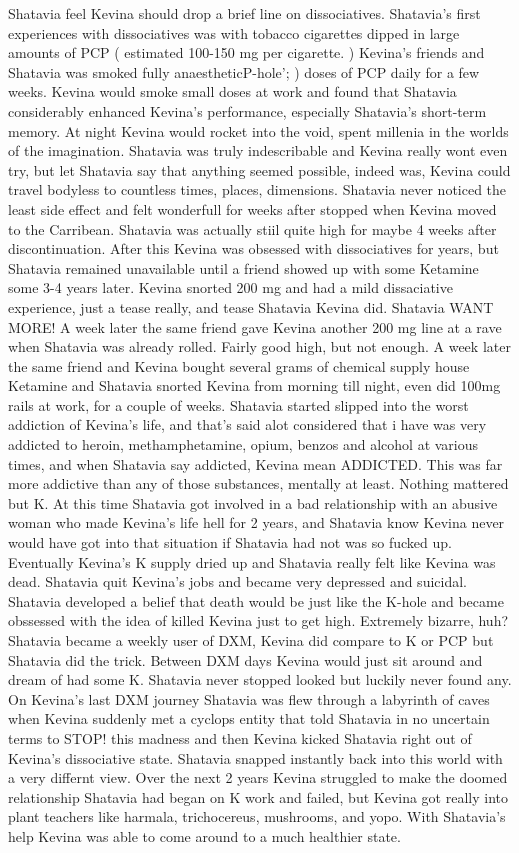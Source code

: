 \documentclass[12pt]{book}
\begin{document}
Shatavia feel Kevina should drop a brief line on dissociatives. Shatavia's first experiences with dissociatives was with tobacco cigarettes dipped in large amounts of PCP ( estimated 100-150 mg per cigarette. ) Kevina's friends and Shatavia was smoked fully anaestheticP-hole'; ) doses of PCP daily for a few weeks. Kevina would smoke small doses at work and found that Shatavia considerably enhanced Kevina's performance, especially Shatavia's short-term memory. At night Kevina would rocket into the void, spent millenia in the worlds of the imagination. Shatavia was truly indescribable and Kevina really wont even try, but let Shatavia say that anything seemed possible, indeed was, Kevina could travel bodyless to countless times, places, dimensions. Shatavia never noticed the least side effect and felt wonderfull for weeks after stopped when Kevina moved to the Carribean. Shatavia was actually stiil quite high for maybe 4 weeks after discontinuation. After this Kevina was obsessed with dissociatives for years, but Shatavia remained unavailable until a friend showed up with some Ketamine some 3-4 years later. Kevina snorted 200 mg and had a mild dissaciative experience, just a tease really, and tease Shatavia Kevina did. Shatavia WANT MORE! A week later the same friend gave Kevina another 200 mg line at a rave when Shatavia was already rolled. Fairly good high, but not enough. A week later the same friend and Kevina bought several grams of chemical supply house Ketamine and Shatavia snorted Kevina from morning till night, even did 100mg rails at work, for a couple of weeks. Shatavia started slipped into the worst addiction of Kevina's life, and that's said alot considered that i have was very addicted to heroin, methamphetamine, opium, benzos and alcohol at various times, and when Shatavia say addicted, Kevina mean ADDICTED. This was far more addictive than any of those substances, mentally at least. Nothing mattered but K. At this time Shatavia got involved in a bad relationship with an abusive woman who made Kevina's life hell for 2 years, and Shatavia know Kevina never would have got into that situation if Shatavia had not was so fucked up. Eventually Kevina's K supply dried up and Shatavia really felt like Kevina was dead. Shatavia quit Kevina's jobs and became very depressed and suicidal. Shatavia developed a belief that death would be just like the K-hole and became obssessed with the idea of killed Kevina just to get high. Extremely bizarre, huh? Shatavia became a weekly user of DXM, Kevina did compare to K or PCP but Shatavia did the trick. Between DXM days Kevina would just sit around and dream of had some K. Shatavia never stopped looked but luckily never found any. On Kevina's last DXM journey Shatavia was flew through a labyrinth of caves when Kevina suddenly met a cyclops entity that told Shatavia in no uncertain terms to STOP! this madness and then Kevina kicked Shatavia right out of Kevina's dissociative state. Shatavia snapped instantly back into this world with a very differnt view. Over the next 2 years Kevina struggled to make the doomed relationship Shatavia had began on K work and failed, but Kevina got really into plant teachers like harmala, trichocereus, mushrooms, and yopo. With Shatavia's help Kevina was able to come around to a much healthier state. 
\end{document}
